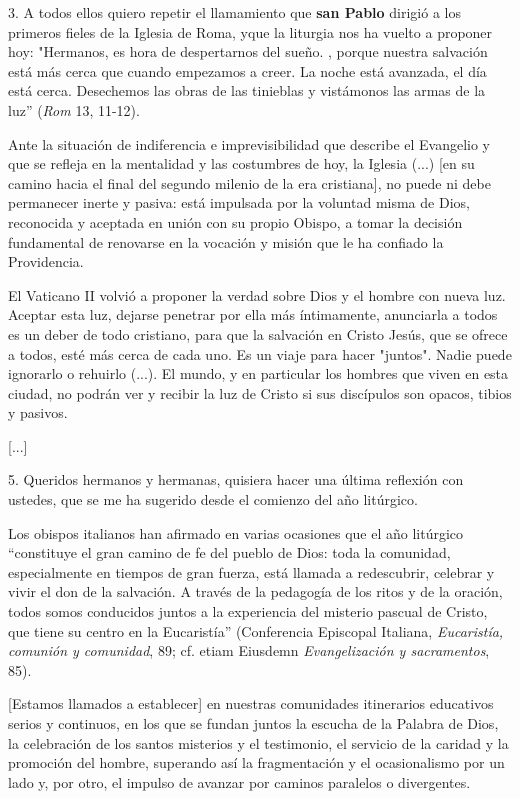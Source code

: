 \begin{body}
3. A todos ellos quiero repetir el llamamiento que \textbf{san Pablo} dirigió a los primeros fieles de la Iglesia de Roma, y ​​que la liturgia nos ha vuelto a proponer hoy: "Hermanos, es hora de despertarnos del sueño. , porque nuestra salvación está más cerca que cuando empezamos a creer. La noche está avanzada, el día está cerca. Desechemos las obras de las tinieblas y vistámonos las armas de la luz'' (\emph{Rom} 13, 11-12).

Ante la situación de indiferencia e imprevisibilidad que describe el Evangelio y que se refleja en la mentalidad y las costumbres de hoy, la Iglesia (...) {[}en su camino hacia el final del segundo milenio de la era cristiana{]}, no puede ni debe permanecer inerte y pasiva: está impulsada por la voluntad misma de Dios, reconocida y aceptada en unión con su propio Obispo, a tomar la decisión fundamental de renovarse en la vocación y misión que le ha confiado la Providencia.

El Vaticano II volvió a proponer la verdad sobre Dios y el hombre con nueva luz. Aceptar esta luz, dejarse penetrar por ella más íntimamente, anunciarla a todos es un deber de todo cristiano, para que la salvación en Cristo Jesús, que se ofrece a todos, esté más cerca de cada uno. Es un viaje para hacer "juntos". Nadie puede ignorarlo o rehuirlo (...). El mundo, y en particular los hombres que viven en esta ciudad, no podrán ver y recibir la luz de Cristo si sus discípulos son opacos, tibios y pasivos.

{[}...{]}

5. Queridos hermanos y hermanas, quisiera hacer una última reflexión con ustedes, que se me ha sugerido desde el comienzo del año litúrgico.

Los obispos italianos han afirmado en varias ocasiones que el año litúrgico ``constituye el gran camino de fe del pueblo de Dios: toda la comunidad, especialmente en tiempos de gran fuerza, está llamada a redescubrir, celebrar y vivir el don de la salvación. A través de la pedagogía de los ritos y de la oración, todos somos conducidos juntos a la experiencia del misterio pascual de Cristo, que tiene su centro en la Eucaristía'' (Conferencia Episcopal Italiana, \emph{Eucaristía, comunión y comunidad}, 89; cf. etiam Eiusdemn \emph{Evangelización y sacramentos}, 85).

{[}Estamos llamados a establecer{]} en nuestras comunidades itinerarios educativos serios y continuos, en los que se fundan juntos la escucha de la Palabra de Dios, la celebración de los santos misterios y el testimonio, el servicio de la caridad y la promoción del hombre, superando así la fragmentación y el ocasionalismo por un lado y, por otro, el impulso de avanzar por caminos paralelos o divergentes.


\end{body}
